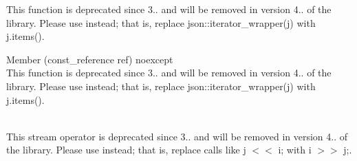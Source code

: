 \begin{DoxyRefList}
This function is deprecated since 3.. and will be removed in version 4.. of the library. Please use  instead; that is, replace {\ttfamily json\+::iterator\+\_\+wrapper(j)} with {\ttfamily j.\+items()}.  
\item[Member \doxylink{classbasic__json_a7c0314258e5347eade0c6851017bf5a5}{basic\+\_\+json\texorpdfstring{$<$}{<} Object\+Type, Array\+Type, String\+Type, Boolean\+Type, Number\+Integer\+Type, Number\+Unsigned\+Type, Number\+Float\+Type, Allocator\+Type, JSONSerializer, Binary\+Type, Custom\+Base\+Class \texorpdfstring{$>$}{>}\+::iterator\+\_\+wrapper} (const\+\_\+reference ref) noexcept]\hfill \\
\label{deprecated__deprecated000006}%
%
This function is deprecated since 3.. and will be removed in version 4.. of the library. Please use  instead; that is, replace {\ttfamily json\+::iterator\+\_\+wrapper(j)} with {\ttfamily j.\+items()}.  
\item[Member \doxylink{classbasic__json_af9907af448f7ff794120033e132025f6}{basic\+\_\+json\texorpdfstring{$<$}{<} Object\+Type, Array\+Type, String\+Type, Boolean\+Type, Number\+Integer\+Type, Number\+Unsigned\+Type, Number\+Float\+Type, Allocator\+Type, JSONSerializer, Binary\+Type, Custom\+Base\+Class \texorpdfstring{$>$}{>}\+::operator\texorpdfstring{$<$}{<}\texorpdfstring{$<$}{<}} (\doxylink{classbasic__json}{basic\+\_\+json} \&j, std\+::istream \&i)]\hfill \\
\label{deprecated__deprecated000004}%
%
This stream operator is deprecated since 3.. and will be removed in version 4.. of the library. Please use  instead; that is, replace calls like {\ttfamily j \texorpdfstring{$<$}{<}\texorpdfstring{$<$}{<} i;} with {\ttfamily i \texorpdfstring{$>$}{>}\texorpdfstring{$>$}{>} j;}. 


\end{DoxyRefList}
